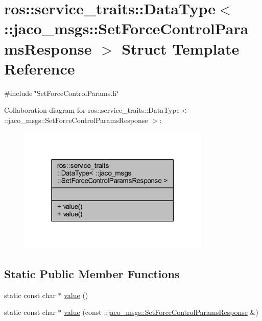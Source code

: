 \hypertarget{structros_1_1service__traits_1_1DataType_3_01_1_1jaco__msgs_1_1SetForceControlParamsResponse_01_4}{}\section{ros\+:\+:service\+\_\+traits\+:\+:Data\+Type$<$ \+:\+:jaco\+\_\+msgs\+:\+:Set\+Force\+Control\+Params\+Response $>$ Struct Template Reference}
\label{structros_1_1service__traits_1_1DataType_3_01_1_1jaco__msgs_1_1SetForceControlParamsResponse_01_4}


{\ttfamily \#include \char`\"{}Set\+Force\+Control\+Params.\+h\char`\"{}}



Collaboration diagram for ros\+:\+:service\+\_\+traits\+:\+:Data\+Type$<$ \+:\+:jaco\+\_\+msgs\+:\+:Set\+Force\+Control\+Params\+Response $>$\+:
\nopagebreak
\begin{figure}[H]
\begin{center}
\leavevmode
\includegraphics[width=259pt]{dc/d0e/structros_1_1service__traits_1_1DataType_3_01_1_1jaco__msgs_1_1SetForceControlParamsResponse_01_4__coll__graph}
\end{center}
\end{figure}
\subsection*{Static Public Member Functions}
\begin{DoxyCompactItemize}
\item 
static const char $\ast$ \hyperlink{structros_1_1service__traits_1_1DataType_3_01_1_1jaco__msgs_1_1SetForceControlParamsResponse_01_4_a0d593380550f07d6ba228a8ba4a60a20}{value} ()
\item 
static const char $\ast$ \hyperlink{structros_1_1service__traits_1_1DataType_3_01_1_1jaco__msgs_1_1SetForceControlParamsResponse_01_4_a902e6bf0a790fc42233fa274c70b96e4}{value} (const \+::\hyperlink{namespacejaco__msgs_afebda443b838c4657280c3c24ba107ba}{jaco\+\_\+msgs\+::\+Set\+Force\+Control\+Params\+Response} \&)
\end{DoxyCompactItemize}


